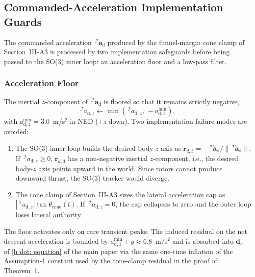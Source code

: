 \documentclass[10pt,journal]{IEEEtran}
\begin{document}
\subsection{Commanded-Acceleration Implementation Guards}
\label{sup:cmd_accel_guards}
The commanded acceleration $\,^\mathcal{I}\boldsymbol{a}_\text{d}$ produced by the funnel-margin cone clamp of Section~III-A3 is processed by two implementation safeguards before being passed to the SO(3) inner loop: an acceleration floor and a low-pass filter.

\subsubsection{Acceleration Floor}
\label{sup:acceleration_floor}
The inertial $z$-component of $\,^\mathcal{I}\boldsymbol{a}_\text{d}$ is floored so that it remains strictly negative,
\begin{equation} \label{sup:acceleration floor eq}
    \,^\mathcal{I}a_{\text{d},z}\leftarrow \min(\,^\mathcal{I}a_{\text{d},z},\,-a_{\text{d},z}^{\min}),
\end{equation}
with $a_{\text{d},z}^{\min}=3.0$~m/s$^2$ in NED ($+z$ down). Two implementation failure modes are avoided:
\begin{enumerate}
    \item The SO(3) inner loop builds the desired body-$z$ axis as $\boldsymbol{r}_{d,3}=-\,^\mathcal{I}\tilde{\boldsymbol{a}}_\text{d}/\|\,^\mathcal{I}\tilde{\boldsymbol{a}}_\text{d}\|$. If $\,^\mathcal{I}a_{\text{d},z}\ge 0$, $\boldsymbol{r}_{d,3}$ has a non-negative inertial $z$-component, i.e., the desired body-$z$ axis points upward in the world. Since rotors cannot produce downward thrust, the SO(3) tracker would diverge.
    \item The cone clamp of Section~III-A3 sizes the lateral acceleration cap as $|\,^\mathcal{I}a_{\text{d},z}|\tan\theta_\text{cone}(t)$. If $\,^\mathcal{I}a_{\text{d},z}=0$, the cap collapses to zero and the outer loop loses lateral authority.
\end{enumerate}
The floor activates only on rare transient peaks. The induced residual on the net descent acceleration is bounded by $a_{\text{d},z}^{\min}+g\approx 6.8$~m/s$^2$ and is absorbed into $\boldsymbol{d}_h$ of \eqref{h dot: equation} of the main paper via the same one-time inflation of the Assumption-1 constant used by the cone-clamp residual in the proof of Theorem~1.
\end{document}
